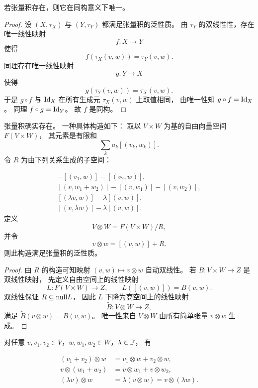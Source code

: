 \begin{proposition} 若张量积存在，则它在同构意义下唯一。 \end{proposition}




\begin{proof} 设 $(X,\tau_X)$ 与 $(Y,\tau_Y)$ 都满足张量积的泛性质。 由 $\tau_Y$ 的双线性性，存在唯一线性映射 \[ f:X\to Y \] 使得 \[ f(\tau_X(v,w))=\tau_Y(v,w). \] 同理存在唯一线性映射 \[ g:Y\to X \] 使得 \[ g(\tau_Y(v,w))=\tau_X(v,w). \] 于是 $g\circ f$ 与 $\mathrm{Id}_X$ 在所有生成元 $\tau_X(v,w)$ 上取值相同， 由唯一性知 $g\circ f=\mathrm{Id}_X$。 同理 $f\circ g=\mathrm{Id}_Y$。 故 $f$ 是同构。 \end{proof}




\begin{theorem} 张量积确实存在。 一种具体构造如下： 取以 $V\times W$ 为基的自由向量空间 $F(V\times W)$， 其元素是有限和 \[ \sum_k a_k[(v_k,w_k)]. \] 令 $R$ 为由下列关系生成的子空间：




\begin{align*} [(v_1+v_2,w)]-[(v_1,w)]-[(v_2,w)],\\ [(v,w_1+w_2)]-[(v,w_1)]-[(v,w_2)],\\ [(\lambda v,w)]-\lambda[(v,w)],\\ [(v,\lambda w)]-\lambda[(v,w)]. \end{align*} 定义 \[ V\otimes W=F(V\times W)/R, \] 并令 \[ v\otimes w=[(v,w)]+R. \] 则此构造满足张量积的泛性质。 \end{theorem}




\begin{proof} 由 $R$ 的构造可知映射 $(v,w)\mapsto v\otimes w$ 自动双线性。 若 $B:V\times W\to Z$ 是双线性映射， 先定义自由空间上的线性映射 \[ L:F(V\times W)\to Z,\qquad L([(v,w)])=B(v,w). \] 双线性保证 $R\subseteq\mathrm{null} L$， 因此 $L$ 下降为商空间上的线性映射 \[ \widetilde{B}:V\otimes W\to Z, \] 满足 $\widetilde{B}(v\otimes w)=B(v,w)$。 唯一性来自 $V\otimes W$ 由所有简单张量 $v\otimes w$ 生成。 \end{proof}




\begin{proposition} 对任意 $v,v_1,v_2\in V$，$w,w_1,w_2\in W$，$\lambda\in\mathbb{F}$， 有




\begin{align*} (v_1+v_2)\otimes w&=v_1\otimes w+v_2\otimes w,\\ v\otimes(w_1+w_2)&=v\otimes w_1+v\otimes w_2,\\ (\lambda v)\otimes w&=\lambda(v\otimes w)=v\otimes(\lambda w). \end{align*} \end{proposition}




